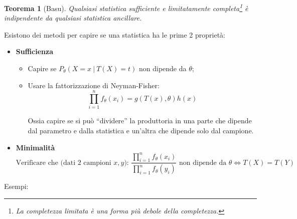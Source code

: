 \documentclass{article}
\newtheorem{theorem}{Teorema}
\begin{document}
\vspace{5pt}

\begin{theorem}[Basu]
    Qualsiasi statistica sufficiente e limitatamente completa\footnote{La completezza limitata è una forma più debole della completezza.} è indipendente da qualsiasi statistica ancillare.
\end{theorem}

\vspace{5pt}

Esistono dei metodi per capire se una statistica ha le prime 2 proprietà:
\begin{itemize}
    \item \textbf{Sufficienza}
        \begin{itemize}
            \item Capire se $P_\theta(X=x\ |\ T(X)=t)$ non dipende da $\theta$;
            \item Usare la fattorizzazione di Neyman-Fisher:
                $$\prod_{i=1}^nf_\theta(x_i)=g(T(x),\theta)h(x)$$

                Ossia capire se si può ``dividere'' la produttoria in una parte che dipende dal parametro e dalla statistica e un'altra che dipende solo dal campione.
                
        \end{itemize}
    \item \textbf{Minimalità}
            $$\text{Verificare che (dati 2 campioni $x,y$): }
            \frac{\prod_{i=1}^nf_\theta(x_i)}{\prod_{i=1}^nf_\theta(y_i)} \text{ non dipende da } \theta \iff T(X)=T(Y)$$
\end{itemize}

Esempi:
\end{document}
